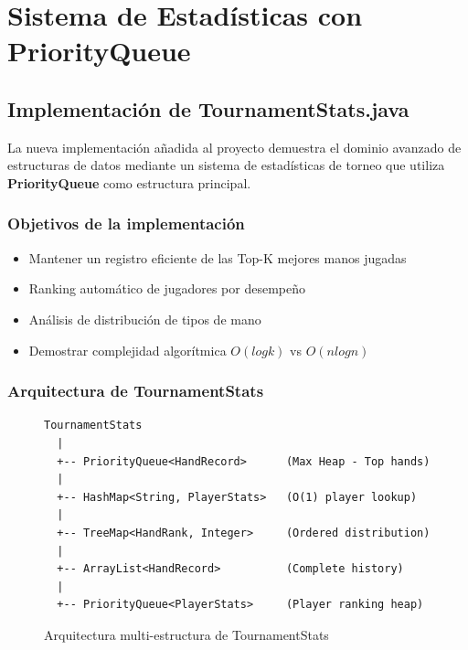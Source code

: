 \documentclass[12pt,a4paper]{article}
\begin{document}
\newpage

\section{Sistema de Estadísticas con PriorityQueue}

\subsection{Implementación de TournamentStats.java}

La nueva implementación añadida al proyecto demuestra el dominio avanzado de estructuras de datos mediante un sistema de estadísticas de torneo que utiliza \textbf{PriorityQueue} como estructura principal.

\subsubsection{Objetivos de la implementación}

\begin{itemize}
    \item Mantener un registro eficiente de las Top-K mejores manos jugadas
    \item Ranking automático de jugadores por desempeño
    \item Análisis de distribución de tipos de mano
    \item Demostrar complejidad algorítmica $O(log k)$ vs $O(n log n)$
\end{itemize}

\subsubsection{Arquitectura de TournamentStats}

\begin{figure}[H]
\centering
\begin{verbatim}
TournamentStats
  |
  +-- PriorityQueue<HandRecord>      (Max Heap - Top hands)
  |
  +-- HashMap<String, PlayerStats>   (O(1) player lookup)
  |
  +-- TreeMap<HandRank, Integer>     (Ordered distribution)
  |
  +-- ArrayList<HandRecord>          (Complete history)
  |
  +-- PriorityQueue<PlayerStats>     (Player ranking heap)
\end{verbatim}
\caption{Arquitectura multi-estructura de TournamentStats}
\end{figure}
\end{document}
